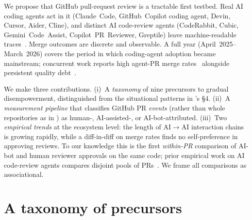 \documentclass{article}
\begin{document}
We propose that GitHub pull-request review is a tractable first testbed. Real AI coding agents act in it (Claude~Code, GitHub~Copilot coding agent, Devin, Cursor, Aider, Cline), and distinct AI code-review agents (CodeRabbit, Cubic, Gemini~Code~Assist, Copilot~PR~Reviewer, Greptile) leave machine-readable traces~\citep{ghaleb2026fingerprinting,staufer2026aiagentindex}. Merge outcomes are discrete and observable. A full year (April~2025--March~2026) covers the period in which coding-agent adoption became mainstream; concurrent work reports high agent-PR merge rates~\citep{watanabe2025agentic,li2026aidev,li2025teammates,logicstar2025wild} alongside persistent quality debt~\citep{agarwal2026ides,ehsani2026fail,huang2026morecode}.

We make three contributions. (i)~A \emph{taxonomy} of nine precursors to gradual disempowerment, distinguished from the situational patterns in \citet{kulveit2025gradual}'s §4. (ii)~A \emph{measurement pipeline} that classifies GitHub PR \emph{events} (rather than whole repositories as in \cite{ghaleb2026fingerprinting}) as human-, AI-assisted-, or AI-bot-attributed. (iii)~Two \emph{empirical trends} at the ecosystem level: the length of AI$\to$AI interaction chains is growing rapidly, while a diff-in-diff on merge rates finds no self-preference in approving reviews. To our knowledge this is the first \emph{within-PR} comparison of AI-bot and human reviewer approvals on the same code; prior empirical work on AI code-review agents compares disjoint pools of PRs~\citep{zhong2026synergy,chowdhury2026claims}. We frame all comparisons as associational.

\section{A taxonomy of precursors}
\label{sec:taxonomy}
\end{document}
